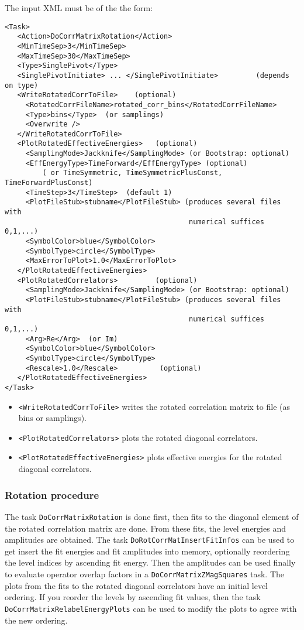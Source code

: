 \documentclass[12pt]{article}
\newcommand{\vb}{\texttt}
\begin{document}
The input XML must be of the the form:
\begin{verbatim}
<Task>
   <Action>DoCorrMatrixRotation</Action>
   <MinTimeSep>3</MinTimeSep>
   <MaxTimeSep>30</MaxTimeSep>
   <Type>SinglePivot</Type>
   <SinglePivotInitiate> ... </SinglePivotInitiate>         (depends on type)
   <WriteRotatedCorrToFile>    (optional)
     <RotatedCorrFileName>rotated_corr_bins</RotatedCorrFileName>
     <Type>bins</Type>  (or samplings)
     <Overwrite />
   </WriteRotatedCorrToFile>
   <PlotRotatedEffectiveEnergies>   (optional)
     <SamplingMode>Jackknife</SamplingMode> (or Bootstrap: optional)
     <EffEnergyType>TimeForward</EffEnergyType> (optional)
         ( or TimeSymmetric, TimeSymmetricPlusConst, TimeForwardPlusConst)
     <TimeStep>3</TimeStep>  (default 1)
     <PlotFileStub>stubname</PlotFileStub> (produces several files with
                                            numerical suffices 0,1,...)
     <SymbolColor>blue</SymbolColor>
     <SymbolType>circle</SymbolType>
     <MaxErrorToPlot>1.0</MaxErrorToPlot>
   </PlotRotatedEffectiveEnergies>
   <PlotRotatedCorrelators>         (optional)
     <SamplingMode>Jackknife</SamplingMode> (or Bootstrap: optional)
     <PlotFileStub>stubname</PlotFileStub> (produces several files with
                                            numerical suffices 0,1,...)
     <Arg>Re</Arg>  (or Im)
     <SymbolColor>blue</SymbolColor>
     <SymbolType>circle</SymbolType>
     <Rescale>1.0</Rescale>          (optional)
   </PlotRotatedEffectiveEnergies>
</Task>
\end{verbatim}
\begin{itemize}
\item \vb{<WriteRotatedCorrToFile>} writes the rotated correlation matrix to file (as bins or samplings).
\item \vb{<PlotRotatedCorrelators>} plots the rotated diagonal correlators.
\item \vb{<PlotRotatedEffectiveEnergies>} plots effective energies for the rotated diagonal correlators.
\end{itemize}

\subsubsection{Rotation procedure}
The task \vb{DoCorrMatrixRotation} is done first, then fits to the diagonal
element of the rotated correlation matrix are done.  From these fits,
the level energies and amplitudes are obtained.  The task
\vb{DoRotCorrMatInsertFitInfos} can be used to get insert the fit energies and
fit amplitudes into memory, optionally reordering the level indices by
ascending fit energy.  Then the amplitudes can be used finally to evaluate
operator overlap factors in a \vb{DoCorrMatrixZMagSquares} task.  The plots
from the fits to the rotated diagonal correlators have an initial level
ordering.  If you reorder the levels by ascending fit values, then the
task \vb{DoCorrMatrixRelabelEnergyPlots} can be used to modify the plots to
agree with the new ordering.\\
\end{document}
